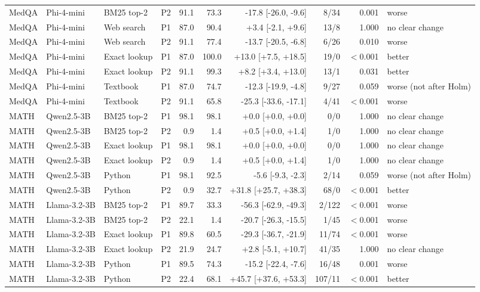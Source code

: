 \begin{tabular}{llll rrr rr l}
MedQA & Phi-4-mini & BM25 top-2 & P2 & 91.1 & 73.3 & -17.8 [-26.0, -9.6] & 8/34 & 0.001 & worse\\
MedQA & Phi-4-mini & Web search & P1 & 87.0 & 90.4 & +3.4 [-2.1, +9.6] & 13/8 & 1.000 & no clear change\\
MedQA & Phi-4-mini & Web search & P2 & 91.1 & 77.4 & -13.7 [-20.5, -6.8] & 6/26 & 0.010 & worse\\
MedQA & Phi-4-mini & Exact lookup & P1 & 87.0 & 100.0 & +13.0 [+7.5, +18.5] & 19/0 & $<$0.001 & better\\
MedQA & Phi-4-mini & Exact lookup & P2 & 91.1 & 99.3 & +8.2 [+3.4, +13.0] & 13/1 & 0.031 & better\\
MedQA & Phi-4-mini & Textbook & P1 & 87.0 & 74.7 & -12.3 [-19.9, -4.8] & 9/27 & 0.059 & worse (not after Holm)\\
MedQA & Phi-4-mini & Textbook & P2 & 91.1 & 65.8 & -25.3 [-33.6, -17.1] & 4/41 & $<$0.001 & worse\\
MATH & Qwen2.5-3B & BM25 top-2 & P1 & 98.1 & 98.1 & +0.0 [+0.0, +0.0] & 0/0 & 1.000 & no clear change\\
MATH & Qwen2.5-3B & BM25 top-2 & P2 & 0.9 & 1.4 & +0.5 [+0.0, +1.4] & 1/0 & 1.000 & no clear change\\
MATH & Qwen2.5-3B & Exact lookup & P1 & 98.1 & 98.1 & +0.0 [+0.0, +0.0] & 0/0 & 1.000 & no clear change\\
MATH & Qwen2.5-3B & Exact lookup & P2 & 0.9 & 1.4 & +0.5 [+0.0, +1.4] & 1/0 & 1.000 & no clear change\\
MATH & Qwen2.5-3B & Python & P1 & 98.1 & 92.5 & -5.6 [-9.3, -2.3] & 2/14 & 0.059 & worse (not after Holm)\\
MATH & Qwen2.5-3B & Python & P2 & 0.9 & 32.7 & +31.8 [+25.7, +38.3] & 68/0 & $<$0.001 & better\\
MATH & Llama-3.2-3B & BM25 top-2 & P1 & 89.7 & 33.3 & -56.3 [-62.9, -49.3] & 2/122 & $<$0.001 & worse\\
MATH & Llama-3.2-3B & BM25 top-2 & P2 & 22.1 & 1.4 & -20.7 [-26.3, -15.5] & 1/45 & $<$0.001 & worse\\
MATH & Llama-3.2-3B & Exact lookup & P1 & 89.8 & 60.5 & -29.3 [-36.7, -21.9] & 11/74 & $<$0.001 & worse\\
MATH & Llama-3.2-3B & Exact lookup & P2 & 21.9 & 24.7 & +2.8 [-5.1, +10.7] & 41/35 & 1.000 & no clear change\\
MATH & Llama-3.2-3B & Python & P1 & 89.5 & 74.3 & -15.2 [-22.4, -7.6] & 16/48 & 0.001 & worse\\
MATH & Llama-3.2-3B & Python & P2 & 22.4 & 68.1 & +45.7 [+37.6, +53.3] & 107/11 & $<$0.001 & better\\

\end{tabular}
